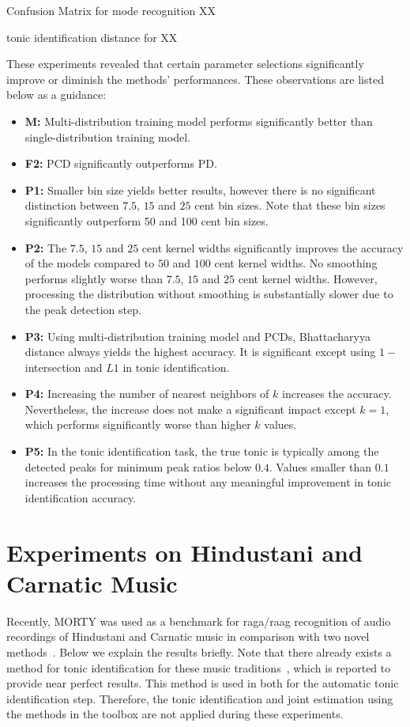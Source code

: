 \documentclass{sig-alternate}
\begin{document}
Confusion Matrix for mode recognition XX

tonic identification distance for XX

These experiments revealed that certain parameter selections significantly improve or diminish the methods' performances. These observations are listed below as a guidance:

\begin{itemize}[noitemsep]
\item \textbf{M:} Multi-distribution training model performs significantly better than single-distribution training model.
\item \textbf{F2:} PCD significantly outperforms PD.
\item \textbf{P1:} Smaller bin size yields better results, however there is no significant distinction between $7.5$, $15$ and $25$ cent bin sizes. Note that these bin sizes significantly outperform 50 and 100 cent bin sizes.
\item \textbf{P2:} The $7.5$, $15$ and $25$ cent kernel widths significantly improves the accuracy of the models compared to $50$ and $100$ cent kernel widths. No smoothing performs slightly worse than $7.5$, $15$ and $25$ cent kernel widths. However, processing the distribution without smoothing is substantially slower due to the peak detection step.
\item \textbf{P3:} Using multi-distribution training model and PCDs, Bhattacharyya distance always yields the highest accuracy. It is significant except using $1-$intersection and $L1$ in tonic identification.
\item \textbf{P4:} Increasing the number of nearest neighbors of $k$ increases the accuracy. Nevertheless, the increase does not make a significant impact except $k = 1$, which performs significantly worse than higher $k$ values.
\item \textbf{P5:} In the tonic identification task, the true tonic is typically among the detected peaks for minimum peak ratios below $0.4$. Values smaller than $0.1$ increases the processing time without any meaningful improvement in tonic identification accuracy.
\end{itemize}

\section{Experiments on Hindustani and Carnatic Music}
\label{sec:hindustani_carnatic}

Recently, MORTY was used as a benchmark for raga/raag recognition of audio recordings of Hindustani and Carnatic music in comparison with two novel methods~\cite{gulati2016raga,gulati_network}. Below we explain the results briefly. Note that there already exists a method for tonic identification for these music traditions~\cite{sankalp_tonic}, which is reported to provide near perfect results. This method is used in both for the automatic tonic identification step. Therefore, the tonic identification and joint estimation using the methods in the toolbox are not applied during these experiments.
\end{document}
